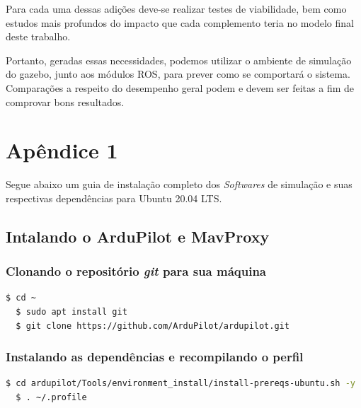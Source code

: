 \documentclass[12pt,a4paper,oneside]{book}
\begin{document}
Para cada uma dessas adições deve-se realizar testes de viabilidade, bem como estudos mais profundos do impacto que cada complemento teria no modelo final deste trabalho. 

Portanto, geradas essas necessidades, podemos utilizar o ambiente de simulação do gazebo, junto aos módulos ROS, para prever como se comportará o sistema. Comparações a respeito do desempenho geral podem e devem ser feitas a fim de comprovar bons resultados.





%

%
%
\thispagestyle{myheadings}

%

%
%
%
%
\appendix
%
%
%
\chapter{Apêndice 1}
%
\thispagestyle{empty} 
%
Segue abaixo um guia de instalação completo dos \textit{Softwares} de simulação e suas respectivas dependências para Ubuntu 20.04 LTS.

\section{Intalando o ArduPilot e MavProxy}

\subsection{Clonando o repositório \textit{git} para sua máquina}
\begin{lstlisting}[language=bash]
  $ cd ~
  $ sudo apt install git
  $ git clone https://github.com/ArduPilot/ardupilot.git
\end{lstlisting}

\subsection{Instalando as dependências e recompilando o perfil}
\begin{lstlisting}[language=bash]
  $ cd ardupilot/Tools/environment_install/install-prereqs-ubuntu.sh -y
  $ . ~/.profile
\end{lstlisting}
\end{document}
